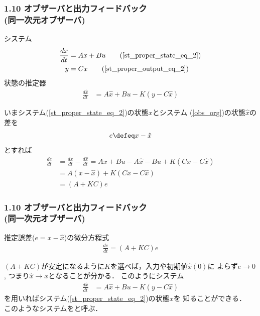 \begin{frame}[t]
\frametitle{1.10 オブザーバと出力フィードバック \\
(同一次元オブザーバ)}
システム
\begin{align}
 \frac{dx}{dt} &= A x + B u \tag{\ref{st_proper_state_eq_2}} \\
 y             &= C x \tag{\ref{st_proper_output_eq_2}}
\end{align}
状態の推定器
\begin{align}
 \frac{d \hat{x}}{dt} &= A \hat{x} + B u - K (y - C \hat{x})
 \tag{1.204} \label{obs_org}
\end{align}
\addtocounter{equation}{4}
いまシステム(\ref{st_proper_state_eq_2})の状態$x$とシステム
(\ref{obs_org})の状態$\hat{x} $の差を
\begin{equation}
 e \defeq x - \hat{x}
\end{equation}
とすれば
\begin{align}
\frac{de}{dt} &= \frac{dx}{dt} - \frac{d \hat{x}}{dt} 
  = A x + B u - A \hat{x} - B u + K ( C x - C \hat{x}) \nonumber \\
 &= A (x - \hat{x}) + K ( C x - C \hat{x}) \nonumber \\
 &= (A + KC) e
\end{align}
\end{frame}


\begin{frame}[t]
\frametitle{1.10 オブザーバと出力フィードバック \\
(同一次元オブザーバ)}

推定誤差($e = x - \hat{x}$)の微分方程式
\begin{align}
\frac{de}{dt} = (A + KC) e \tag{1.206}
\end{align}



$(A+KC)$が安定になるように$K$を選べば，入力や初期値$\hat{x}(0)$に
よらず$e \rightarrow 0$, つまり$\hat{x} \rightarrow x$となることが分かる．
このようにシステム
\begin{align}
 \frac{d \hat{x}}{dt} &= A \hat{x} + B u - K (y - C \hat{x})
 \tag{1.204} \label{obs_org}
\end{align}
を用いればシステム(\ref{st_proper_state_eq_2})の状態$x$を
知ることができる．\\
このようなシステムをと呼ぶ．\\
\end{frame}


